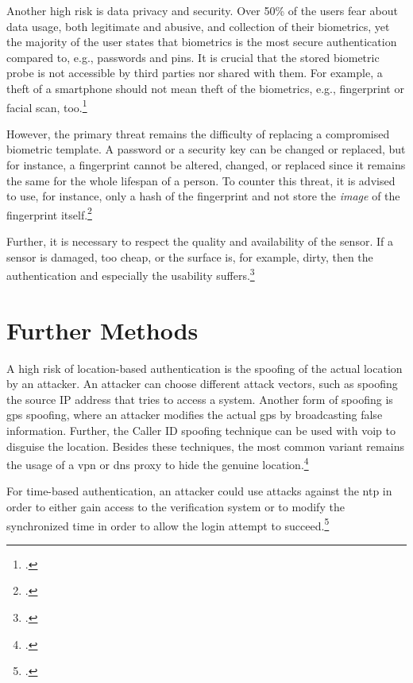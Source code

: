 Another high risk is data privacy and security. Over 50\% of the users fear about data usage, both legitimate and abusive, and collection of their biometrics, yet the majority of the user states that biometrics is the most secure authentication compared to, e.g., passwords and \glspl{pin}. It is crucial that the stored biometric probe is not accessible by third parties nor shared with them. For example, a theft of a smartphone should not mean theft of the biometrics, e.g., fingerprint or facial scan, too.\footcites[See][8]{ibm-security}

However, the primary threat remains the difficulty of replacing a compromised biometric template. A password or a security key can be changed or replaced, but for instance, a fingerprint cannot be altered, changed, or replaced since it remains the same for the whole lifespan of a person. To counter this threat, it is advised to use, for instance, only a hash of the fingerprint and not store the \textit{image} of the fingerprint itself.\footcites[See][266]{shostack2014threat}

Further, it is necessary to respect the quality and availability of the sensor. If a sensor is damaged, too cheap, or the surface is, for example, dirty, then the authentication and especially the usability suffers.\footcites[See][37]{265831}

\section{Further Methods}

A high risk of location-based authentication is the spoofing of the actual location by an attacker. An attacker can choose different attack vectors, such as spoofing the source IP address that tries to access a system. Another form of spoofing is \gls{gps} spoofing, where an attacker modifies the actual \gls{gps} by broadcasting false information. Further, the Caller ID spoofing technique can be used with \gls{voip} to disguise the location. Besides these techniques, the most common variant remains the usage of a \gls{vpn} or \gls{dns} proxy to hide the genuine location.\footcites[See][138--145]{517355}[See][Chapter 4.5.3]{30270}[See][115--116,133]{eckert-it-sec-9}

For time-based authentication, an attacker could use attacks against the \gls{ntp} in order to either gain access to the verification system or to modify the synchronized time in order to allow the login attempt to succeed.\footcite[See][]{malhotraattacking}
